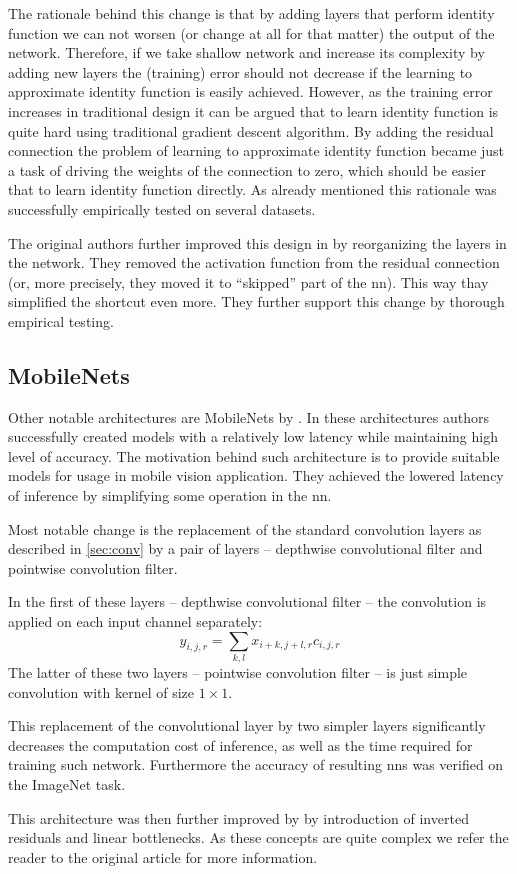 The rationale behind this change is that by adding layers that perform identity
function we can not worsen (or change at all for that matter) the output of the
network. Therefore, if we take shallow network and increase its complexity by
adding new layers the (training) error should not decrease if the learning to
approximate identity function is easily achieved. However, as the training
error increases in traditional design it can be argued that to learn identity
function is quite hard using traditional gradient descent algorithm. By adding
the residual connection the problem of learning to approximate identity function
became just a task of driving the weights of the connection to zero, which
should be easier that to learn identity function directly. As already mentioned
this rationale was successfully empirically tested on several datasets.

The original authors further improved this design in \cite{resnetimp} by
reorganizing the layers in the network. They removed the activation function
from the residual connection (or, more precisely, they moved it to ``skipped''
part of the \gls{nn}). This way thay simplified the shortcut even more. They
further support this change by thorough empirical testing.

\subsection{MobileNets}

\label{ssec:mobilenet}

Other notable architectures are MobileNets by \cite{mobilenets}. In these
architectures authors successfully created models with a relatively low latency while
maintaining high level of accuracy. The motivation behind such architecture is
to provide suitable models for usage in mobile vision application. They
achieved the lowered latency of inference by simplifying some operation in the \gls{nn}.

Most notable change is the replacement of the standard convolution layers as
described in \autoref{sec:conv} by a pair of layers -- depthwise convolutional
filter and pointwise convolution filter.

In the first of these layers -- depthwise convolutional filter -- the
convolution is applied on each input channel separately:
$$y_{i, j, r} = \sum_{k, l} x_{i+k, j+l, r} c_{i, j, r}$$
The latter of these two layers -- pointwise convolution filter -- is just simple
convolution with kernel of size $1 \times 1$.

This replacement of the convolutional layer by two simpler layers significantly
decreases the computation cost of inference, as well
as the time required for training such network. Furthermore the accuracy of
resulting \glspl{nn} was verified on the ImageNet task.

This architecture was then further improved by \cite{mobilenetv2} by
introduction of inverted residuals and linear bottlenecks. As these concepts
are quite complex we refer the reader to the original article for more
information.


